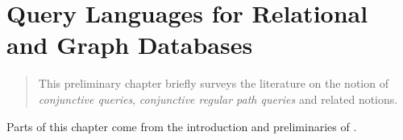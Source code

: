 \chapter{Query Languages for Relational and Graph Databases}
\label{ch:prelim-graph-databases}
\renewcommand\thefigure{\thechapter.\arabic{figure}}

\begin{chapterpresentation}
	\begin{abstract}
		This preliminary chapter briefly surveys the literature on
		the notion of \emph{conjunctive queries},
		\emph{conjunctive regular path queries} and related notions.

	\end{abstract}
	\par\bigskip\bigskip
	\begin{acknowledgements}
		Parts of this chapter come from the introduction and preliminaries of \cite{FigueiraMorvan2025SemanticTreeWidthLMCS,FigueiraMorvanRomero2025Minimizing}.
	\end{acknowledgements}
	\clearpagepresentation
	\chaptertocstandalone
\end{chapterpresentation}


% 